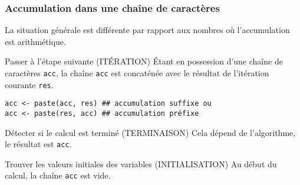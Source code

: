 \documentclass[10pt]{beamer}
\begin{document}
\begin{frame}[fragile]
  \frametitle{Accumulation dans une chaîne de caractères}
  La situation générale est différente par rapport aux nombres où l'accumulation est arithmétique.
  \begin{block}{Passer à l'étape suivante (\alert{ITÉRATION})}
    Étant en possession d'une chaîne de caractères \texttt{acc}, la chaîne \texttt{acc} est concaténée avec le résultat de l'itération courante \texttt{res}.
    \begin{lstlisting}
acc <- paste(acc, res) ## accumulation suffixe ou
acc <- paste(res, acc) ## accumulation préfixe
    \end{lstlisting}
  \end{block}

  \begin{block}{Détecter si le calcul est terminé (\alert{TERMINAISON})}
    Cela dépend de l'algorithme, le résultat est \texttt{acc}.
  \end{block}

  \begin{block}{Trouver les valeurs initiales des variables (\alert{INITIALISATION})}
    Au début du calcul, la chaîne \texttt{acc} est vide.
  \end{block}
\end{frame}
\end{document}
